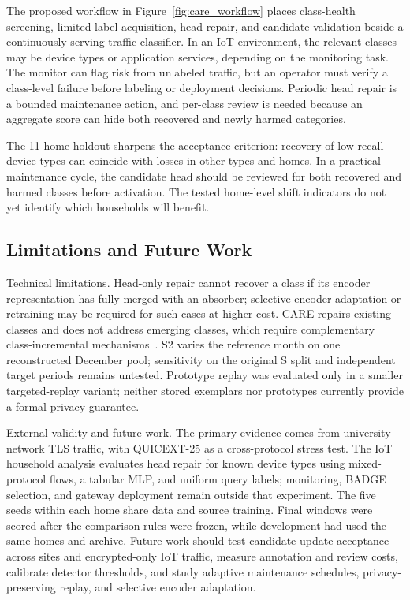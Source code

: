 \documentclass[journal]{IEEEtran}
\newcommand{\ours}{CARE}  %
\begin{document}
The proposed workflow in Figure~\ref{fig:care_workflow} places class-health screening, limited label acquisition, head repair, and candidate validation beside a continuously serving traffic classifier. In an IoT environment, the relevant classes may be device types or application services, depending on the monitoring task. The monitor can flag risk from unlabeled traffic, but an operator must verify a class-level failure before labeling or deployment decisions. Periodic head repair is a bounded maintenance action, and per-class review is needed because an aggregate score can hide both recovered and newly harmed categories.

The 11-home holdout sharpens the acceptance criterion: recovery of low-recall device types can coincide with losses in other types and homes. In a practical maintenance cycle, the candidate head should be reviewed for both recovered and harmed classes before activation. The tested home-level shift indicators do not yet identify which households will benefit.

\subsection{Limitations and Future Work}
\label{sec:discussion_limitations}

Technical limitations.
Head-only repair cannot recover a class if its encoder representation has fully merged with an absorber; selective encoder adaptation or retraining may be required for such cases at higher cost. \ours{} repairs existing classes and does not address emerging classes, which require complementary class-incremental mechanisms~\cite{cai2024cpn}. S2 varies the reference month on one reconstructed December pool; sensitivity on the original S split and independent target periods remains untested. Prototype replay was evaluated only in a smaller targeted-replay variant; neither stored exemplars nor prototypes currently provide a formal privacy guarantee.

External validity and future work.
The primary evidence comes from university-network TLS traffic, with QUICEXT-25 as a cross-protocol stress test. The IoT household analysis evaluates head repair for known device types using mixed-protocol flows, a tabular MLP, and uniform query labels; monitoring, BADGE selection, and gateway deployment remain outside that experiment. The five seeds within each home share data and source training. Final windows were scored after the comparison rules were frozen, while development had used the same homes and archive. Future work should test candidate-update acceptance across sites and encrypted-only IoT traffic, measure annotation and review costs, calibrate detector thresholds, and study adaptive maintenance schedules, privacy-preserving replay, and selective encoder adaptation.
\end{document}
